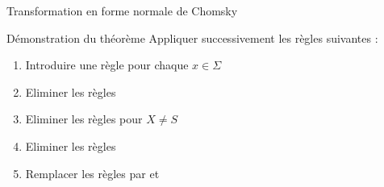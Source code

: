 
\begingroup

\begin{frame}{Transformation en forme normale de Chomsky}\label{slide:FNC}

  \begin{block}{Démonstration du théorème}
    Appliquer successivement les règles suivantes :
    \begin{enumerate}
    \item Introduire une règle  pour chaque $x\in \Sigma$
    \item Eliminer les règles  
    \item Eliminer les règles  pour $X \not= S$
    \item Eliminer les règles 
    \item Remplacer les règles  par  et 
    \end{enumerate}
  \end{block}


\end{frame}
